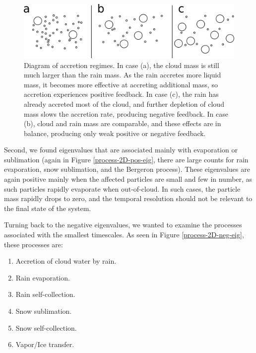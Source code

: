 \documentclass [11pt, proquest] {uwthesis}[2020/02/24]
\begin{document}
\begin{figure}[htbp]
  \includegraphics[width=6.5in]{./accretion_regimes.png}
  \caption[Diagram of accretion regimes]{Diagram of accretion regimes. In case (a), the cloud mass is still much larger than the rain mass. As the rain accretes more liquid mass, it becomes more effective at accreting additional mass, so accretion experiences positive feedback. In case (c), the rain has already accreted most of the cloud, and further depletion of cloud mass slows the accretion rate, producing negative feedback. In case (b), cloud and rain mass are comparable, and these effects are in balance, producing only weak positive or negative feedback.}
  \label{accretion-regimes}
\end{figure}

Second, we found eigenvalues that are associated mainly with evaporation or sublimation (again in Figure \ref{process-2D-pos-eig}, there are large counts for rain evaporation, snow sublimation, and the Bergeron process). These eigenvalues are again positive mainly when the affected particles are small and few in number, as such particles rapidly evaporate when out-of-cloud. In such cases, the particle mass rapidly drops to zero, and the temporal resolution should not be relevant to the final state of the system.

Turning back to the negative eigenvalues, we wanted to examine the processes associated with the smallest timescales. As seen in Figure \ref{process-2D-neg-eig}, these processes are:

\begin{enumerate}
\item Accretion of cloud water by rain.
\item Rain evaporation.
\item Rain self-collection.
\item Snow sublimation.
\item Snow self-collection.
\item Vapor/Ice transfer.
\end{enumerate}
\end{document}
